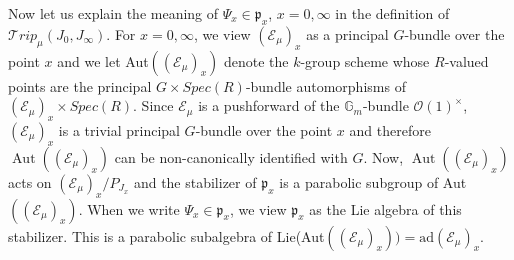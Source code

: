 \documentclass{amsart}
\newcommand{\cE}{\mathcal{E}}
\theoremstyle{plain}
\theoremstyle{definition}
\theoremstyle{remark}
\DeclareMathOperator{\aut}{Aut}
\begin{document}
Now let us explain the meaning of $\Psi_{x}\in\mathfrak{p}_{x}$, $x=0,\infty$ in the definition of $\mathcal{T}rip_{\mu}(J_{0},J_{\infty})$. 
For $x=0,\infty$, we view $(\cE_{\mu})_{x}$ as a principal $G$-bundle over the point $x$ and we let Aut$((\cE_{\mu})_x)$ denote the $k$-group scheme 
whose $R$-valued points are the principal $G\times Spec(R)$-bundle automorphisms of $(\cE_{\mu})_{x}\times Spec(R)$. 
Since $\cE_{\mu}$ is a pushforward of the $\mathbb{G}_{m}$-bundle $\mathcal{O}(1)^{\times}$, $(\cE_{\mu})_{x}$ is a trivial principal $G$-bundle over the point $x$ and therefore $\aut((\cE_{\mu})_{x})$ can be non-canonically identified with $G$. Now, $\aut((\cE_{\mu})_{x})$ acts on $(\cE_{\mu})_{x}/P_{J_{x}}$ and the stabilizer of $\mathfrak{p}_{x}$ is a parabolic subgroup of Aut$((\cE_{\mu})_x)$.
When we write $\Psi_{x}\in\mathfrak{p}_{x}$, we view $\mathfrak{p}_{x}$ as the Lie algebra of this stabilizer. This is a parabolic subalgebra of Lie(Aut$((\cE_{\mu})_{x}))=\text{ad}(\cE_{\mu})_{x}$.
\end{document}
